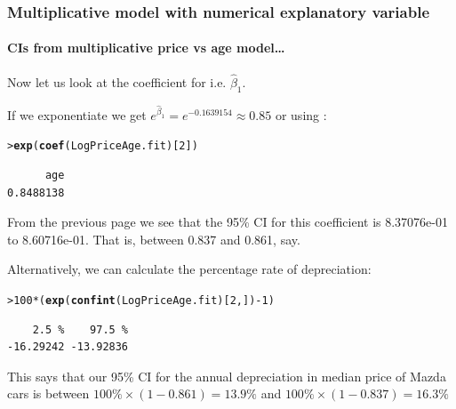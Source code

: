 \documentclass{beamer}\usepackage[]{graphicx}\usepackage[]{xcolor}
\makeatletter
\newcommand{\hlnum}[1]{\textcolor[rgb]{0.686,0.059,0.569}{#1}}%
\newcommand{\hlopt}[1]{\textcolor[rgb]{0,0,0}{#1}}%
\newcommand{\hlstd}[1]{\textcolor[rgb]{0.345,0.345,0.345}{#1}}%
\newcommand{\hlkwd}[1]{\textcolor[rgb]{0.737,0.353,0.396}{\textbf{#1}}}%
\newenvironment{kframe}{%
 \def\at@end@of@kframe{}%
 \ifinner\ifhmode%
  \def\at@end@of@kframe{\end{minipage}}%
  \begin{minipage}{\columnwidth}%
 \fi\fi%
 \def\FrameCommand##1{\hskip\@totalleftmargin \hskip-\fboxsep
 \colorbox{shadecolor}{##1}\hskip-\fboxsep
     \hskip-\linewidth \hskip-\@totalleftmargin \hskip\columnwidth}%
 \MakeFramed {\advance\hsize-\width
   \@totalleftmargin\z@ \linewidth\hsize
   \@setminipage}}%
 {\par\unskip\endMakeFramed%
 \at@end@of@kframe}
\newenvironment{knitrout}{}{} %
\makeatother
\begin{document}
\begin{frame}[fragile]
\frametitle{Multiplicative model with numerical explanatory variable}
\framesubtitle{CIs from multiplicative price vs age model\ldots}

Now let us look at the coefficient for  i.e. $\hat{\beta}_1$.\\
\medskip

If we exponentiate we get $e^{\hat{\beta}_1}=e^{-0.1639154} \approx 0.85$ 
or using :
\begin{knitrout}\scriptsize
{}\color{fgcolor}\begin{kframe}
\begin{alltt}
\hlstd{> }\hlkwd{exp}\hlstd{(}\hlkwd{coef}\hlstd{(LogPriceAge.fit)[}\hlnum{2}\hlstd{])}
\end{alltt}
\begin{verbatim}
      age 
0.8488138 
\end{verbatim}
\end{kframe}
\end{knitrout}
\medskip

From the previous page we see that the 95\% CI for this coefficient is 8.37076e-01  to 8.60716e-01. That is, between 0.837 and 0.861, say.
\bigskip

Alternatively, we can calculate the percentage rate of depreciation:
\medskip
\begin{knitrout}\scriptsize
{}\color{fgcolor}\begin{kframe}
\begin{alltt}
\hlstd{> }\hlnum{100}\hlopt{*}\hlstd{(}\hlkwd{exp}\hlstd{(}\hlkwd{confint}\hlstd{(LogPriceAge.fit)[}\hlnum{2}\hlstd{,])}\hlopt{-}\hlnum{1}\hlstd{)}
\end{alltt}
\begin{verbatim}
    2.5 %    97.5 % 
-16.29242 -13.92836 
\end{verbatim}
\end{kframe}
\end{knitrout}

This says that our 95\% CI for the annual depreciation in median price of Mazda cars is
between $100\% \times (1 - 0.861) =  13.9\%$ and $100\% \times (1 - 0.837) =  16.3\%$
\end{frame}
\end{document}

